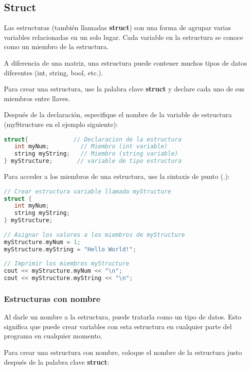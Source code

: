 \subsection{Struct}
Las estructuras (también llamadas \textbf{struct}) son una forma de agrupar varias variables relacionadas en un solo lugar. Cada variable en la estructura se conoce como un miembro de la estructura.

A diferencia de una matriz, una estructura puede contener muchos tipos de datos diferentes (int, string, bool, etc.). 

Para crear una estructura, use la palabra clave \textbf{struct} y declare cada uno de sus miembros entre llaves.

Después de la declaración, especifique el nombre de la variable de estructura (myStructure en el ejemplo siguiente): 

\begin{lstlisting}[language=C++]
struct{             // Declaracion de la estructura
   int myNum;         // Miembro (int variable)
   string myString;   // Miembro (string variable)
} myStructure;       // variable de tipo estructura
\end{lstlisting}

Para acceder a los miembros de una estructura, use la sintaxis de punto (.): 

\begin{lstlisting}[language=C++]
// Crear estructura variable llamada myStructure
struct {
   int myNum;
   string myString;
} myStructure;
	
// Asignar los valores a los miembros de myStructure
myStructure.myNum = 1;
myStructure.myString = "Hello World!";
	
// Imprimir los miembros myStructure
cout << myStructure.myNum << "\n";
cout << myStructure.myString << "\n";
\end{lstlisting}

\subsubsection{Estructuras con nombre}

Al darle un nombre a la estructura, puede tratarla como un tipo de datos. Esto significa que puede crear variables con esta estructura en cualquier parte del programa en cualquier momento.

Para crear una estructura con nombre, coloque el nombre de la estructura justo después de la palabra clave \textbf{struct}: 

